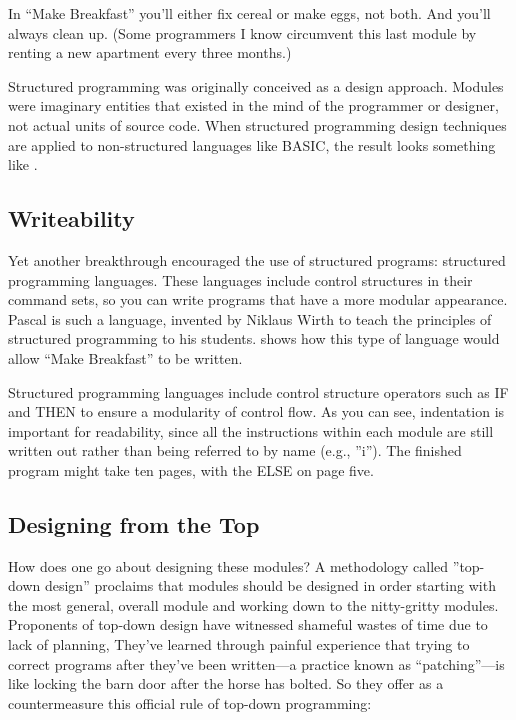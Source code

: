 In {}``Make Breakfast'' you'll either fix cereal or make eggs, not
both. And you'll always clean up. (Some programmers I know circumvent
this last module by renting a new apartment every three months.)

%

Structured programming was originally conceived as a design approach.
Modules were imaginary entities that existed in the mind of the programmer
or designer, not actual units of source code. When structured programming
design techniques are applied to non-structured languages like BASIC,
the result looks something like .


\subsection{Writeability}

Yet another breakthrough encouraged the use of structured programs:
structured programming languages. These languages include control
structures in their command sets, so you can write programs that have
a more modular appearance. Pascal is such a language, invented by
Niklaus Wirth to teach the principles of structured programming to
his students.  shows how this type of language would allow
{}``Make Breakfast'' to be written.

%

Structured programming languages include control structure operators
such as IF and THEN to ensure a modularity of control flow. As you
can see, indentation is important for readability, since all the instructions
within each module are still written out rather than being referred
to by name (e.g., ''i''). The finished program might take ten pages,
with the ELSE on page five.


\subsection{Designing from the Top}

How does one go about designing these modules? A methodology called
''top-down design'' proclaims that modules should be designed in order
starting with the most general, overall module and working down to
the nitty-gritty modules. Proponents of top-down design have witnessed
shameful wastes of time due to lack of planning, They've learned through
painful experience that trying to correct programs after they've been
written---a practice known as {}``patching''---is like locking the
barn door after the horse has bolted. So they offer as a countermeasure
this official rule of top-down programming:

